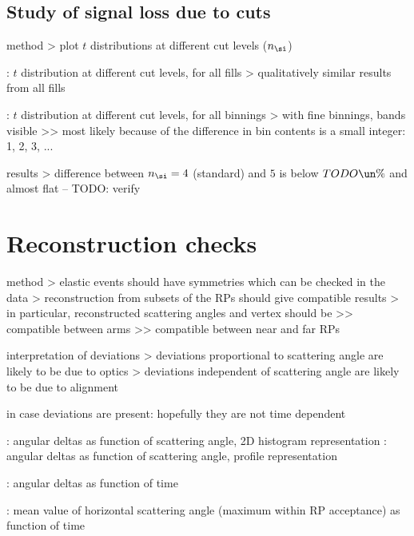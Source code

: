 \section{Study of signal loss due to cuts}

\> method
\>> plot $t$ distributions at different cut levels ($n_\si$)

\> : $t$ distribution at different cut levels, for all fills
\>> qualitatively similar results from all fills

\> : $t$ distribution at different cut levels, for all binnings
\>> with fine binnings, bands visible
\>>> most likely because of the difference in bin contents is a small integer: 1, 2, 3, ...

\> results
\>> difference between $n_\si = 4$ (standard) and $5$ is below $TODO\un{\%}$ and almost flat -- TODO: verify



\chapter[reco-checks]{Reconstruction checks}

\> method
\>> elastic events should have symmetries which can be checked in the data
\>> reconstruction from subsets of the RPs should give compatible results
\>> in particular, reconstructed scattering angles and vertex should be
\>>> compatible between arms
\>>> compatible between near and far RPs

\> interpretation of deviations
\>> deviations proportional to scattering angle are likely to be due to optics
\>> deviations independent of scattering angle are likely to be due to alignment

\> in case deviations are present: hopefully they are not time dependent

\> : angular deltas as function of scattering angle, 2D histogram representation
\> : angular deltas as function of scattering angle, profile representation

\> : angular deltas as function of time

\> : mean value of horizontal scattering angle (maximum within RP acceptance) as function of time

